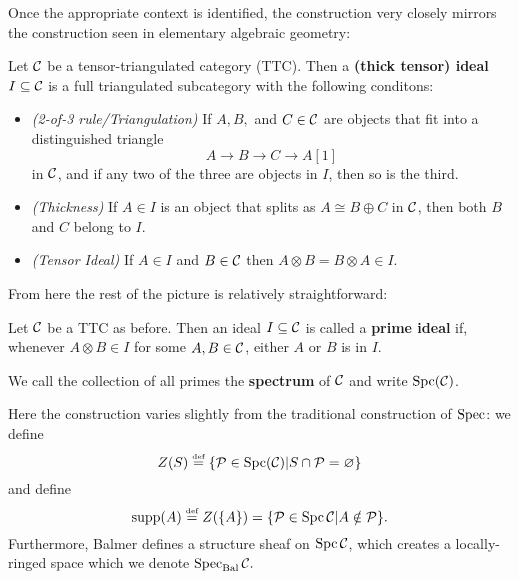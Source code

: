 \documentclass [11pt, proquest] {uwthesis}[2020/02/24]
\DeclareMathOperator{\Spc}{Spc}
\begin{document}
    Once the appropriate context is identified, the construction 
    very closely mirrors the construction seen in elementary algebraic geometry:
    \begin{defn}
    	Let $\mathcal{C}$ be a tensor-triangulated category (TTC). Then a \textbf{(thick tensor) ideal} $I\subseteq \mathcal{C}$ is a full triangulated subcategory 
    	with the following conditons:
    	\begin{itemize}
    		\item \textit{(2-of-3 rule/Triangulation)} If $A,B,$ and $C\in\mathcal{C}$ are objects that fit into a distinguished triangle
    		\[A\to B\to C\to A[1]\]
    		in $\mathcal{C}$, and if any two of the three are objects in $I$, then so is the third.
    		\item \textit{(Thickness)} If $A\in I$ is an object that splits as $A\cong B\oplus C$ in $\mathcal{C}$, then both $B$ and $C$ belong to $I$.
    		\item \textit{(Tensor Ideal)} If $A\in I$ and $B\in \mathcal{C}$ then $A\otimes B=B\otimes A\in I$.
    	\end{itemize}
    \end{defn}
    
    From here the rest of the picture is relatively straightforward:
    \begin{defn}
    	Let $\mathcal{C}$ be a TTC as before. Then an ideal $I\subseteq\mathcal{C}$ is called a \textbf{prime ideal}
    	if, whenever $A\otimes B\in I$ for some $A,B\in \mathcal{C}$, either $A$ or $B$ is in $I$.
    
    	We call the collection of all primes the \textbf{spectrum} of $\mathcal{C}$ and write 
    	$\operatorname{Spc}(\mathcal{C})$.
    \end{defn}
    
    Here the construction varies slightly from the traditional construction of $\operatorname{Spec}$: we define 
    \[Z(S)\eqdef\{\calP\in\Spc(\calC)|S\cap\calP=\varnothing\}\]
    and define 
    \[\supp(A)\eqdef Z(\{A\})=\{\calP\in\Spc\calC|A\notin \calP\}.\]
    Furthermore, Balmer defines a structure sheaf on $\Spc\calC$, which creates a locally-ringed space which we denote $\operatorname{Spec}_\text{Bal}\mathcal{C}.$
    
\end{document}
